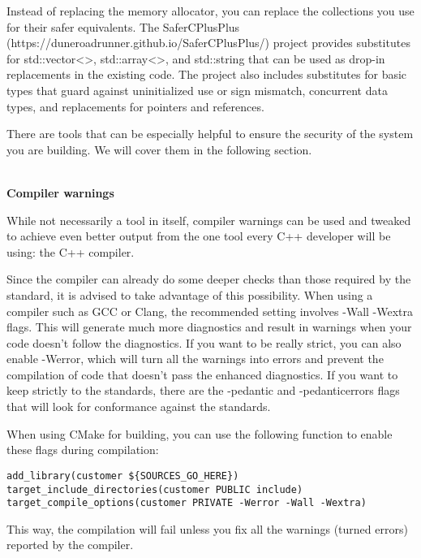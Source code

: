 Instead of replacing the memory allocator, you can replace the collections you use for their safer equivalents. The SaferCPlusPlus (https://duneroadrunner.github.io/SaferCPlusPlus/) project provides substitutes for std::vector<>, std::array<>, and std::string that can be used as drop-in replacements in the existing code. The project also includes substitutes for basic types that guard against uninitialized use or sign mismatch, concurrent data types, and replacements for pointers and references.


There are tools that can be especially helpful to ensure the security of the system you are building. We will cover them in the following section.

\hspace*{\fill} \\ %
\noindent
\textbf{Compiler warnings}

While not necessarily a tool in itself, compiler warnings can be used and tweaked to achieve even better output from the one tool every C++ developer will be using: the C++ compiler.

Since the compiler can already do some deeper checks than those required by the standard, it is advised to take advantage of this possibility. When using a compiler such as GCC or Clang, the recommended setting involves -Wall -Wextra flags. This will generate much more diagnostics and result in warnings when your code doesn't follow the diagnostics. If you want to be really strict, you can also enable -Werror, which will turn all the warnings into errors and prevent the compilation of code that doesn't pass the enhanced diagnostics. If you want to keep strictly to the standards, there are the -pedantic and -pedanticerrors flags that will look for conformance against the standards.

When using CMake for building, you can use the following function to enable these flags during compilation:

\begin{lstlisting}[style=styleCMake]
add_library(customer ${SOURCES_GO_HERE})
target_include_directories(customer PUBLIC include)
target_compile_options(customer PRIVATE -Werror -Wall -Wextra)
\end{lstlisting}

This way, the compilation will fail unless you fix all the warnings (turned errors) reported by the compiler.

